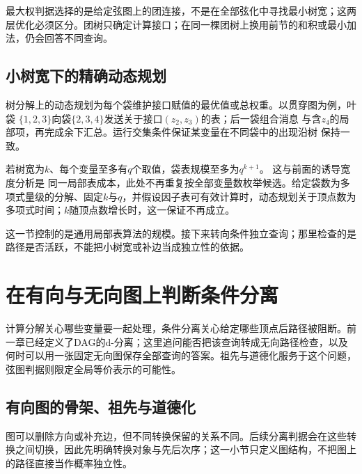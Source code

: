 最大权判据选择的是给定弦图上的团连接，不是在全部弦化中寻找最小树宽；这两层优化必须区分。团树只确定计算接口；在同一棵团树上换用前节的和积或最小加法，仍会回答不同查询。

\subsection{小树宽下的精确动态规划}

树分解上的动态规划为每个袋维护接口赋值的最优值或总权重。以贯穿图为例，叶袋
\(\{1,2,3\}\)向袋\(\{2,3,4\}\)发送关于接口\((z_2,z_3)\)的表；后一袋组合消息
与含\(z_4\)的局部项，再完成余下汇总。运行交集条件保证某变量在不同袋中的出现沿树
保持一致。

若树宽为\(k\)、每个变量至多有\(q\)个取值，袋表规模至多为\(q^{k+1}\)。
这与前面的诱导宽度分析是
同一局部表成本，此处不再重复按全部变量数枚举候选。给定袋数为多项式量级的分解、固定\(k\)与\(q\)，并假设因子表可有效计算时，动态规划关于顶点数为多项式时间；\(k\)随顶点数增长时，这一保证不再成立。

这一节控制的是通用局部表算法的规模。接下来转向条件独立查询；那里检查的是路径是否活跃，不能把小树宽或补边当成独立性的依据。

\section{在有向与无向图上判断条件分离}
\label{sec:graph-theory-conditional-separation}

计算分解关心哪些变量要一起处理，条件分离关心给定哪些顶点后路径被阻断。前一章已经定义了DAG的d-分离；这里追问能否把该查询转成无向路径检查，以及何时可以用一张固定无向图保存全部查询的答案。祖先与道德化服务于这个问题，弦图判据则限定全局等价表示的可能性。

\subsection{有向图的骨架、祖先与道德化}
\label{sec:graph-theory-directed-transformations}

图可以删除方向或补充边，但不同转换保留的关系不同。后续分离判据会在这些转换之间切换，因此先明确转换对象与先后次序；这一小节只定义图结构，不把图上的路径直接当作概率独立性。

